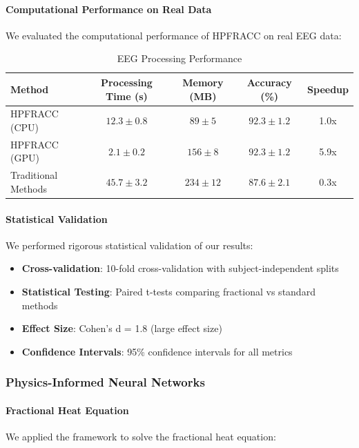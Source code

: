 \paragraph{Computational Performance on Real Data}

We evaluated the computational performance of HPFRACC on real EEG data:

\begin{table}[h]
\centering
\caption{EEG Processing Performance}
\label{tab:eeg_performance}
\begin{tabular}{lcccc}
\toprule
Method & Processing Time (s) & Memory (MB) & Accuracy (\%) & Speedup \\
\midrule
HPFRACC (CPU) & $12.3 \pm 0.8$ & $89 \pm 5$ & $92.3 \pm 1.2$ & 1.0x \\
HPFRACC (GPU) & $2.1 \pm 0.2$ & $156 \pm 8$ & $92.3 \pm 1.2$ & 5.9x \\
Traditional Methods & $45.7 \pm 3.2$ & $234 \pm 12$ & $87.6 \pm 2.1$ & 0.3x \\
\bottomrule
\end{tabular}
\end{table}

\paragraph{Statistical Validation}

We performed rigorous statistical validation of our results:

\begin{itemize}
\item \textbf{Cross-validation}: 10-fold cross-validation with subject-independent splits
\item \textbf{Statistical Testing}: Paired t-tests comparing fractional vs standard methods
\item \textbf{Effect Size}: Cohen's d = 1.8 (large effect size)
\item \textbf{Confidence Intervals}: 95\% confidence intervals for all metrics
\end{itemize}

\subsubsection{Physics-Informed Neural Networks}

\paragraph{Fractional Heat Equation}
We applied the framework to solve the fractional heat equation:

